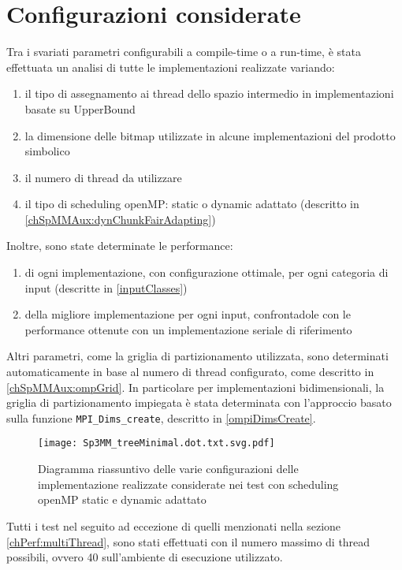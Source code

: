 \section{Configurazioni considerate}
Tra i svariati parametri configurabili a compile-time o a run-time, è stata effettuata 
un analisi di tutte le implementazioni realizzate variando:
\begin{enumerate}
	\item	il tipo di assegnamento ai thread dello spazio intermedio in implementazioni basate su UpperBound 
	\item	la dimensione delle bitmap utilizzate in alcune implementazioni del prodotto simbolico %
	\item	il numero di thread da utilizzare 
	\item	il tipo di scheduling openMP: static o dynamic adattato (descritto in \ref{chSpMMAux:dynChunkFairAdapting})
	\setcounter{queriesCounter}{\value{enumi}}
\end{enumerate}
Inoltre, sono state determinate le performance:
\begin{enumerate}
	\setcounter{queriesCounter}{\value{enumi}}
	\item	di ogni implementazione, con configurazione ottimale, per ogni categoria di input (descritte in \ref{inputClasses})
	\item	della migliore implementazione per ogni input, confrontadole con le performance ottenute con un implementazione seriale di riferimento
\end{enumerate}
Altri parametri, come la griglia di partizionamento utilizzata, sono determinati automaticamente in base al numero di thread configurato,
come descritto in \ref{chSpMMAux:ompGrid}.
In particolare per implementazioni bidimensionali, la griglia di partizionamento impiegata è stata determinata con l'approccio
basato sulla funzione \verb|MPI_Dims_create|, descritto in \ref{ompiDimsCreate}.\\
\begin{figure}[H]
  \centering \texttt{[image: Sp3MM\_treeMinimal.dot.txt.svg.pdf]}
  \caption[implementazioni Sp3MM realizzate]
  {Diagramma riassuntivo delle varie configurazioni delle implementazione realizzate considerate nei test con scheduling openMP static e dynamic adattato}
  \decoRule \label{fig:q1}
\end{figure}
\voidLine
Tutti i test nel seguito ad eccezione di quelli menzionati nella sezione \ref{chPerf:multiThread}, sono stati effettuati 
con il numero massimo di thread possibili, ovvero 40 sull'ambiente di esecuzione utilizzato.\\


